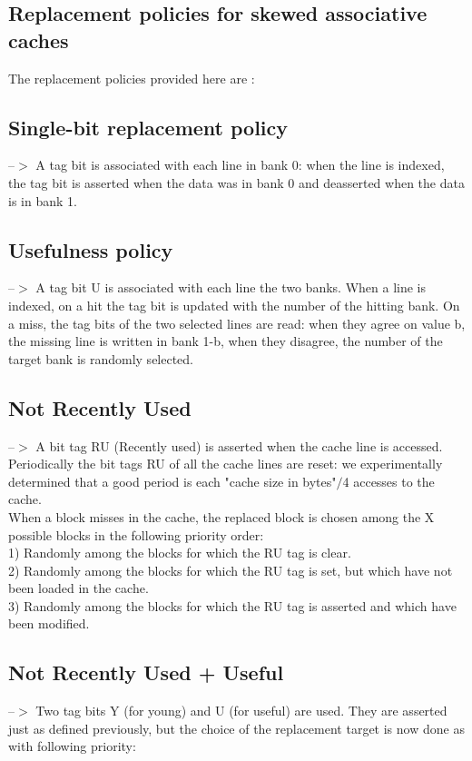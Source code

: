 \documentclass{article}
\begin{document}
\begin{large}
\section{Replacement policies for skewed associative caches}
The replacement policies provided here are :

\subsection{Single-bit replacement policy}--$>$ 
A tag bit is associated with each line in bank 0: when the line is indexed, the tag bit is asserted when the data was in bank 0 and deasserted when the data is in bank 1.

\subsection{Usefulness policy} --$>$ 
A tag bit U is associated with each line the two banks. When a line is indexed, on a hit the tag bit is updated with the number of the hitting bank.
On a miss, the tag bits of the two selected lines are read: when they agree on value b, the missing line is written in bank 1-b, when they disagree, the number of the target bank is randomly selected.


\subsection{Not Recently Used} --$>$
A bit tag RU (Recently used) is asserted when the cache line is accessed.
Periodically the bit tags RU of all the cache lines are reset: we
experimentally determined that a good period is each "cache size in
bytes"$/$4 accesses to the cache.\\

\qquad When a block misses in the cache, the replaced block is chosen among the X possible blocks in the following priority order:\\

1) Randomly among the blocks for which the RU tag is clear.\\

2) Randomly among the blocks for which the RU tag is set, but which have not been loaded in the cache.\\

3) Randomly among the blocks for which the RU tag is asserted and which have been modified.


\subsection{Not Recently Used + Useful} --$>$ 
Two tag bits Y (for young) and U (for useful) are used. They are asserted just as defined previously, but the choice of the replacement target is now done as with following priority:\\


\end{large}
\end{document}
